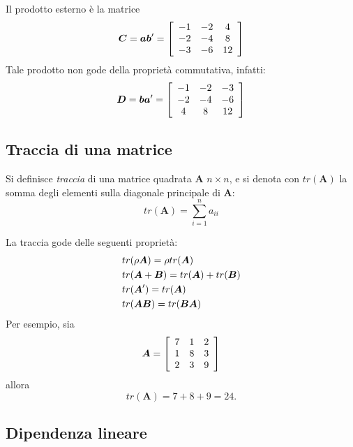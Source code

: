 Il prodotto esterno {\`e} la matrice
\begin{displaymath}
\boldsymbol{C} = \boldsymbol{a}\boldsymbol{b}'= \left[
\begin{array}{c c c}
-1 & -2 & 4\\
-2 & -4 & 8\\
-3 & -6 & 12
\end{array}
 \right]
\end{displaymath}
Tale prodotto non gode della propriet{\`a}
commutativa, infatti:
\begin{displaymath}
\boldsymbol{D} = \boldsymbol{b}\boldsymbol{a}'= \left[
\begin{array}{c c c}
-1 & -2 & -3\\
-2 & -4 & -6\\
4 & 8 & 12
\end{array}
 \right]
\end{displaymath}

\subsection{Traccia di una matrice}

Si definisce \emph{traccia} di una matrice quadrata $\boldsymbol{A}$ $n \times n$, e si denota con $tr(\boldsymbol{A})$ la somma degli elementi sulla diagonale principale di $\boldsymbol{A}$:
\[
tr(\boldsymbol{A}) = \sum_{i=1}^{n} a_{ii}
\]

La traccia gode delle seguenti propriet{\`a}:
\begin{align}
&tr(\rho \boldsymbol{A}) = \rho tr( \boldsymbol{A}) \notag \\
&tr(\boldsymbol{A} + \boldsymbol{B}) =  tr( \boldsymbol{A})+tr( \boldsymbol{B}) \notag \\
&tr(\boldsymbol{A}') =  tr( \boldsymbol{A}) \notag \\
&tr(\boldsymbol{AB}) =  tr( \boldsymbol{BA}) \notag
\end{align}
Per esempio, sia
\begin{displaymath}
\boldsymbol{A} =  \left[ \begin{array}{c c c}
7 & 1 & 2\\
1 & 8 & 3\\
2 & 3 & 9 \end{array} \right]
\end{displaymath}
allora
\[
tr(\boldsymbol{A}) = 7 + 8 + 9 = 24.
\]

\subsection{Dipendenza lineare}

